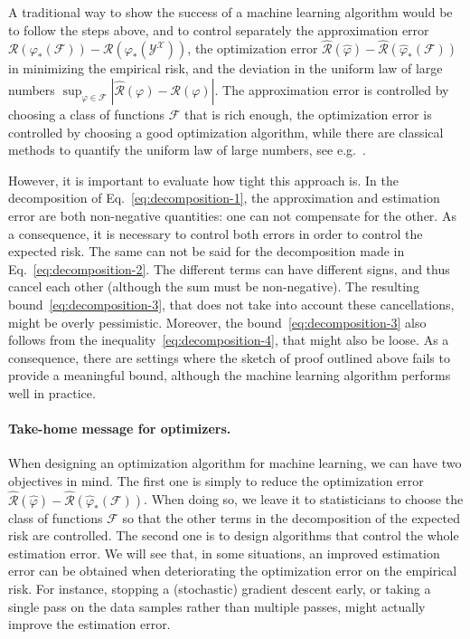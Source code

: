 \documentclass[11pt,reqno]{article}
\newcommand{\cF}{\mathcal{F}}
\newcommand{\cX}{\mathcal{X}}
\newcommand{\cY}{\mathcal{Y}}
\newcommand{\cR}{\mathcal{R}}
\numberwithin{equation}{section}
\theoremstyle{plain}
\theoremstyle{definition}
\theoremstyle{remark}
\begin{document}
A traditional way to show the success of a machine learning algorithm would be to follow the steps above, and to control separately the approximation error $\cR(\varphi_*(\cF)) - \cR(\varphi_*(\cY^\cX))$, the optimization error $\widehat{\cR}(\widehat{\varphi}) - \widehat{\cR}(\widehat{\varphi}_*(\cF))$ in minimizing the empirical risk, and the deviation in the uniform law of large numbers $\sup_{\varphi\in\cF} \left|\widehat{\cR}(\varphi) - {\cR}(\varphi)\right|$. The approximation error is controlled by choosing a class of functions $\cF$ that is rich enough, the optimization error is controlled by choosing a good optimization algorithm, while there are classical methods to quantify the uniform law of large numbers, see e.g.~\cite[Section 4.4]{bach2024learning}. 

However, it is important to evaluate how tight this approach is. In the decomposition of Eq.~\eqref{eq:decomposition-1}, the approximation and estimation error are both non-negative quantities: one can not compensate for the other. As a consequence, it is necessary to control both errors in order to control the expected risk. The same can not be said for the decomposition made in Eq.~\eqref{eq:decomposition-2}. The different terms can have different signs, and thus cancel each other (although the sum must be non-negative). The resulting bound~\eqref{eq:decomposition-3}, that does not take into account these cancellations, might be overly pessimistic. Moreover, the bound~\eqref{eq:decomposition-3} also follows from the inequality~\eqref{eq:decomposition-4}, that might also be loose. As a consequence, there are settings where the sketch of proof outlined above fails to provide a meaningful bound, although the machine learning algorithm performs well in practice.

\paragraph{Take-home message for optimizers.}When designing an optimization algorithm for machine learning, we can have two objectives in mind. The first one is simply to reduce the optimization error $\widehat{\cR}(\widehat{\varphi}) - \widehat{\cR}(\widehat{\varphi}_*(\cF))$. When doing so, we leave it to statisticians to choose the class of functions $\cF$ so that the other terms in the decomposition of the expected risk are controlled. The second one is to design algorithms that control the whole estimation error. We will see that, in some situations, an improved estimation error can be obtained when deteriorating the optimization error on the empirical risk. For instance, stopping a (stochastic) gradient descent early, or taking a single pass on the data samples rather than multiple passes, might actually improve the estimation error. 
\end{document}
